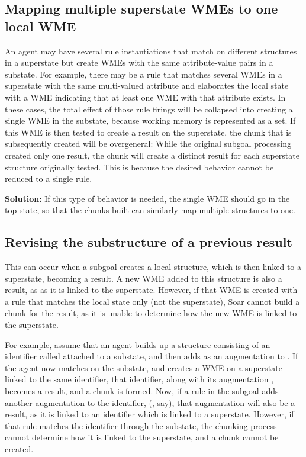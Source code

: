 \subsection{Mapping multiple superstate WMEs to one local WME}

An agent may have several rule instantiations that match on different
structures in a superstate but create WMEs with the same attribute-value pairs
in a substate. For example, there may be a rule that matches several WMEs in a
superstate with the same multi-valued attribute and elaborates the local state
with a WME indicating that at least one WME with that attribute exists.  In
these cases, the total effect of those rule firings will be collapsed into
creating a single WME in the substate, because working memory is represented as
a set.  If this WME is then tested to create a result on the superstate, the
chunk that is subsequently created will be overgeneral: While the original
subgoal processing created only one result, the chunk will create a distinct
result for each superstate structure originally tested. This is because the
desired behavior cannot be reduced to a single rule.

\textbf{Solution:} If this type of behavior is needed, the single WME should go
in the top state, so that the chunks built can similarly map multiple
structures to one.

\subsection{Revising the substructure of a previous result}

This can occur when a subgoal creates a local structure, which is then linked to a
superstate, becoming a result. A new WME added to this structure is also a result, as
as it is linked to the superstate. However, if that WME is created
with a rule that matches the local state only (not the superstate), Soar cannot
build a chunk for the result, as it is unable to determine how the new WME is linked
to the superstate.

For example, assume that an agent builds up a structure consisting of an identifier
called  attached to a substate, and then adds
 as an augmentation to .
If the agent now matches  on the substate, and creates a WME on a
superstate linked to the same identifier, that identifier, along with its
augmentation , becomes a result, and a chunk is formed.
Now, if a rule in the subgoal adds another augmentation to the 
identifier, (, say), that augmentation will also be
a result, as it is linked to an identifier which is linked to a superstate.
However, if that rule matches the identifier through the substate, the chunking
process cannot determine how it is linked to the superstate, and a chunk cannot
be created.


